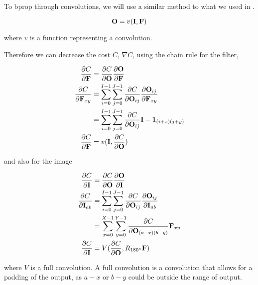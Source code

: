 To \gls{bprop} through convolutions, we will use a similar method to what we used in .

\begin{equation}
\mathbf{O}=v(\mathbf{I},\mathbf{F})
\end{equation}

where $v$ is a function representing a convolution. 


Therefore we can decrease the \gls{cost} $C$, $\nabla C$, using the chain rule for the filter,

\begin{equation}
\begin{split}
\frac{\partial C}{\partial \mathbf{F}} &= \frac{\partial C}{\partial \mathbf{O}}\frac{\partial \mathbf{O}}{\partial \mathbf{F}}\\
\frac{\partial C}{\partial \mathbf{F}_{xy}} &= \sum_{i=0}^{I-1}{\sum_{j=0}^{J-1}{\frac{\partial C}{\partial \mathbf{O}_{ij}}\frac{\partial \mathbf{O}_{ij}}{\partial \mathbf{F}_{xy}}}}\\
&= \sum_{i=0}^{I-1}{\sum_{j=0}^{J-1}{\frac{\partial C}{\partial \mathbf{O}_{ij}}\mathbf{I-1}_{(i+x)(j+y)}}}\\
\frac{\partial C}{\partial \mathbf{F}} &=v(\mathbf{I}, \frac{\partial C}{\partial \mathbf{O}})
\end{split}
\end{equation}

and also for the image

\begin{equation}
\begin{split}
\frac{\partial C}{\partial \mathbf{I}} &= \frac{\partial C}{\partial \mathbf{O}}\frac{\partial \mathbf{O}}{\partial \mathbf{I}}\\
\frac{\partial C}{\partial \mathbf{I}_{ab}} &= \sum_{i=0}^{I-1}{\sum_{j=0}^{J-1}{\frac{\partial C}{\partial \mathbf{O}_{ij}}\frac{\partial \mathbf{O}_{ij}}{\partial \mathbf{I}_{ab}}}}\\
&= \sum_{x=0}^{X-1}{\sum_{y=0}^{Y-1}{\frac{\partial C}{\partial \mathbf{O}_{(a-x)(b-y)}}\mathbf{F}_{xy}}}\\
\frac{\partial C}{\partial \mathbf{I}} &= V(\frac{\partial C}{\partial \mathbf{O}}, R_{180\degree}\mathbf{F})
\end{split}
\end{equation}

where $V$ is a full convolution. A full convolution is a convolution that allows for a padding of the output, as $a-x$ or $b-y$ could be outside the range of output.\cite{backcnn}

